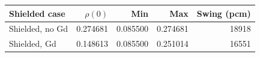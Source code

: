 \begin{center}\small
\begin{tabular}{lrrrr}
\toprule
Shielded case & $\rho(0)$ & Min & Max & Swing (pcm) \\
\midrule
Shielded, no Gd & 0.274681 & 0.085500 & 0.274681 & 18918 \\
Shielded, Gd & 0.148613 & 0.085500 & 0.251014 & 16551 \\
\bottomrule
\end{tabular}
\end{center}
